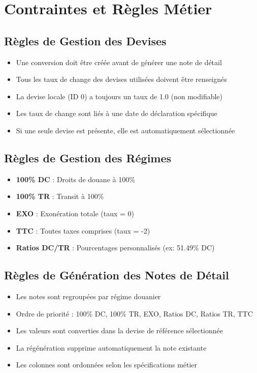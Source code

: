 \documentclass[12pt,a4paper]{report}
\begin{document}
\section{Contraintes et Règles Métier}

\subsection{Règles de Gestion des Devises}

\begin{itemize}[leftmargin=*]
    \item Une conversion doit être créée avant de générer une note de détail
    \item Tous les taux de change des devises utilisées doivent être renseignés
    \item La devise locale (ID 0) a toujours un taux de 1.0 (non modifiable)
    \item Les taux de change sont liés à une date de déclaration spécifique
    \item Si une seule devise est présente, elle est automatiquement sélectionnée
\end{itemize}

\subsection{Règles de Gestion des Régimes}

\begin{itemize}[leftmargin=*]
    \item \textbf{100\% DC} : Droits de douane à 100\%
    \item \textbf{100\% TR} : Transit à 100\%
    \item \textbf{EXO} : Exonération totale (taux = 0)
    \item \textbf{TTC} : Toutes taxes comprises (taux = -2)
    \item \textbf{Ratios DC/TR} : Pourcentages personnalisés (ex: 51.49\% DC)
\end{itemize}

\subsection{Règles de Génération des Notes de Détail}

\begin{itemize}[leftmargin=*]
    \item Les notes sont regroupées par régime douanier
    \item Ordre de priorité : 100\% DC, 100\% TR, EXO, Ratios DC, Ratios TR, TTC
    \item Les valeurs sont converties dans la devise de référence sélectionnée
    \item La régénération supprime automatiquement la note existante
    \item Les colonnes sont ordonnées selon les spécifications métier
\end{itemize}
\end{document}
